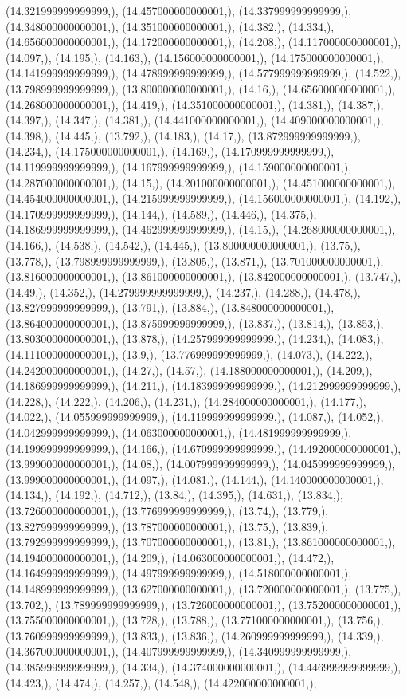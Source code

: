 \documentclass{article}
\begin{document}
(14.321999999999999,), (14.457000000000001,), (14.337999999999999,), (14.348000000000001,), (14.351000000000001,), (14.382,), (14.334,), (14.656000000000001,), (14.172000000000001,), (14.208,), (14.117000000000001,), (14.097,), (14.195,), (14.163,), (14.156000000000001,), (14.175000000000001,), (14.141999999999999,), (14.478999999999999,), (14.577999999999999,), (14.522,), (13.798999999999999,), (13.800000000000001,), (14.16,), (14.656000000000001,), (14.268000000000001,), (14.419,), (14.351000000000001,), (14.381,), (14.387,), (14.397,), (14.347,), (14.381,), (14.441000000000001,), (14.409000000000001,), (14.398,), (14.445,), (13.792,), (14.183,), (14.17,), (13.872999999999999,), (14.234,), (14.175000000000001,), (14.169,), (14.170999999999999,), (14.119999999999999,), (14.167999999999999,), (14.159000000000001,), (14.287000000000001,), (14.15,), (14.201000000000001,), (14.451000000000001,), (14.454000000000001,), (14.215999999999999,), (14.156000000000001,), (14.192,), (14.170999999999999,), (14.144,), (14.589,), (14.446,), (14.375,), (14.186999999999999,), (14.462999999999999,), (14.15,), (14.268000000000001,), (14.166,), (14.538,), (14.542,), (14.445,), (13.800000000000001,), (13.75,), (13.778,), (13.798999999999999,), (13.805,), (13.871,), (13.701000000000001,), (13.816000000000001,), (13.861000000000001,), (13.842000000000001,), (13.747,), (14.49,), (14.352,), (14.279999999999999,), (14.237,), (14.288,), (14.478,), (13.827999999999999,), (13.791,), (13.884,), (13.848000000000001,), (13.864000000000001,), (13.875999999999999,), (13.837,), (13.814,), (13.853,), (13.803000000000001,), (13.878,), (14.257999999999999,), (14.234,), (14.083,), (14.111000000000001,), (13.9,), (13.776999999999999,), (14.073,), (14.222,), (14.242000000000001,), (14.27,), (14.57,), (14.188000000000001,), (14.209,), (14.186999999999999,), (14.211,), (14.183999999999999,), (14.212999999999999,), (14.228,), (14.222,), (14.206,), (14.231,), (14.284000000000001,), (14.177,), (14.022,), (14.055999999999999,), (14.119999999999999,), (14.087,), (14.052,), (14.042999999999999,), (14.063000000000001,), (14.481999999999999,), (14.199999999999999,), (14.166,), (14.670999999999999,), (14.492000000000001,), (13.999000000000001,), (14.08,), (14.007999999999999,), (14.045999999999999,), (13.999000000000001,), (14.097,), (14.081,), (14.144,), (14.140000000000001,), (14.134,), (14.192,), (14.712,), (13.84,), (14.395,), (14.631,), (13.834,), (13.726000000000001,), (13.776999999999999,), (13.74,), (13.779,), (13.827999999999999,), (13.787000000000001,), (13.75,), (13.839,), (13.792999999999999,), (13.707000000000001,), (13.81,), (13.861000000000001,), (14.194000000000001,), (14.209,), (14.063000000000001,), (14.472,), (14.164999999999999,), (14.497999999999999,), (14.518000000000001,), (14.148999999999999,), (13.627000000000001,), (13.720000000000001,), (13.775,), (13.702,), (13.789999999999999,), (13.726000000000001,), (13.752000000000001,), (13.755000000000001,), (13.728,), (13.788,), (13.771000000000001,), (13.756,), (13.760999999999999,), (13.833,), (13.836,), (14.260999999999999,), (14.339,), (14.367000000000001,), (14.407999999999999,), (14.340999999999999,), (14.385999999999999,), (14.334,), (14.374000000000001,), (14.446999999999999,), (14.423,), (14.474,), (14.257,), (14.548,), (14.422000000000001,), 
\end{document}

